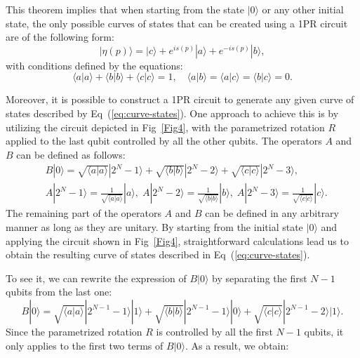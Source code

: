 \documentclass[10pt,letterpaper]{article} %
\newcommand{\fref}[1]{Fig~\ref{#1}}
\newcommand{\eref}[1]{Eq~(\ref{#1})}
\begin{document}
This theorem implies that when starting from the state $|0\rangle$ 
or any other initial state, the only possible curves of states that can be 
created using a 1PR circuit are of the following form:
\begin{equation}
|\eta(p)\rangle = |c\rangle + e^{is(p)}|a\rangle + e^{-is(p)} |b\rangle,
\label{eq:curve-states}
\end{equation}
with conditions defined by the equations: 
\begin{equation}
\langle a| a\rangle + \langle b| b\rangle + \langle c| c\rangle = 1,  \quad
\langle a |b\rangle =
\langle a |c\rangle =
\langle b |c\rangle = 0.
\label{eq:conditions-vecs}
\end{equation}

Moreover, it is possible to construct a 1PR circuit to generate any given curve of 
states described by \eref{eq:curve-states}. 
One approach to achieve this is by utilizing the circuit 
depicted in \fref{Fig4}, 
with the parametrized rotation $R$ applied to the last qubit controlled by all the 
other qubits. The operators $A$ and $B$ can be defined as follows: 
\begin{align*}
&B|0\rangle = \sqrt{\langle a | a \rangle} |2^{N}-1 \rangle + \sqrt{\langle b | b \rangle} |2^{N}-2\rangle + \sqrt{\langle c |c \rangle} |2^N-3\rangle, \\
&A|2^N-1 \rangle = \frac{1}{\sqrt{\langle a | a \rangle}} |a\rangle,\; A|2^{N}-2\rangle = \frac{1}{\sqrt{\langle b | b \rangle}}|b\rangle, \; A|2^{N}-3\rangle = \frac{1}{\sqrt{\langle c | c \rangle}}|c\rangle.
\end{align*}
The remaining part of the operators $A$ and $B$ can be defined
in any arbitrary manner as long as they are unitary. 
By starting from the initial state $|0\rangle$ and 
applying the circuit shown in \fref{Fig4}, straightforward calculations 
lead us to obtain the resulting curve of states described in \eref{eq:curve-states}.

To see it,  we can rewrite the expression of $B|0\rangle$ by 
separating the first $N-1$ qubits from the last one:
$$B|0\rangle = \sqrt{\langle a | a \rangle} |2^{N-1}-1\rangle |1\rangle + \sqrt{\langle b | b \rangle} |2^{N-1}-1\rangle |0\rangle + \sqrt{\langle c | c \rangle} |2^{N-1}-2\rangle |1\rangle.$$
Since the parametrized rotation $R$ is controlled by all the first $N-1$ qubits, it only applies to the first two terms of $B|0\rangle$. As a result, we obtain: 
\end{document}
